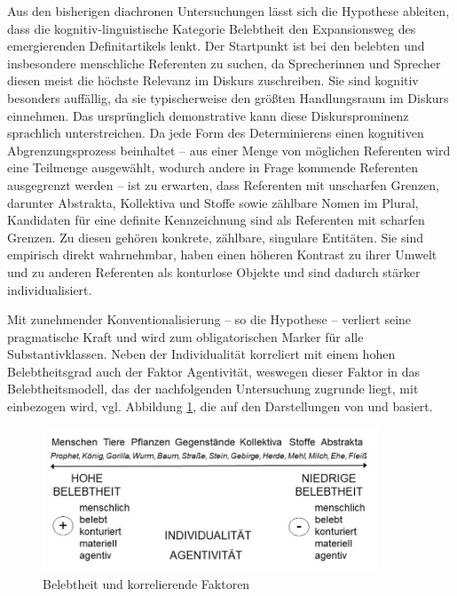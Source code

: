 Aus den bisherigen diachronen Untersuchungen lässt sich die Hypothese ableiten, dass die kognitiv-linguistische Kategorie Belebtheit den Expansionsweg des emergierenden Definitartikels lenkt. Der Startpunkt ist bei den belebten und insbesondere menschliche Referenten zu suchen, da Sprecherinnen und Sprecher diesen meist die höchste Relevanz im Diskurs zuschreiben.
Sie sind kognitiv besonders auffällig, da sie typischerweise den größten Handlungsraum im Diskurs einnehmen. Das ursprünglich demonstrative  kann diese Diskursprominenz sprachlich unterstreichen. Da jede Form des Determinierens einen kognitiven Abgrenzungsprozess beinhaltet -- aus einer Menge von möglichen Referenten wird eine Teilmenge ausgewählt, wodurch andere in Frage kommende Referenten ausgegrenzt werden -- ist zu erwarten, dass Referenten mit unscharfen Grenzen, darunter Abstrakta, Kollektiva und Stoffe sowie zählbare Nomen im Plural,  Kandidaten für eine definite Kennzeichnung sind als Referenten mit scharfen Grenzen. Zu diesen gehören konkrete, zählbare, singulare Entitäten. Sie sind empirisch direkt wahrnehmbar, haben einen höheren Kontrast zu ihrer Umwelt und zu anderen Referenten als konturlose Objekte und sind dadurch stärker individualisiert. 

Mit zunehmender Konventionalisierung -- so die Hypothese -- verliert  seine pragmatische Kraft und wird zum obligatorischen Marker für alle Substantivklassen. Neben der Individualität korreliert mit einem hohen Belebtheitsgrad auch der Faktor Agentivität, weswegen dieser Faktor in das Belebtheitsmodell, das der nachfolgenden Untersuchung zugrunde liegt, mit einbezogen wird, vgl. Abbildung \ref{abb:belebtheit-gesamt}, die auf den Darstellungen von \textcite[345]{Szczepaniak2011} und \textcite[98]{Nubling2012} basiert.  
    
\begin{figure}[h]
\begin{center}
\includegraphics[width=10cm]{images/belebtheitsskala-transparent.jpg}
\caption{Belebtheit und korrelierende Faktoren}
\label{abb:belebtheit-gesamt}
\end{center}
\end{figure}


